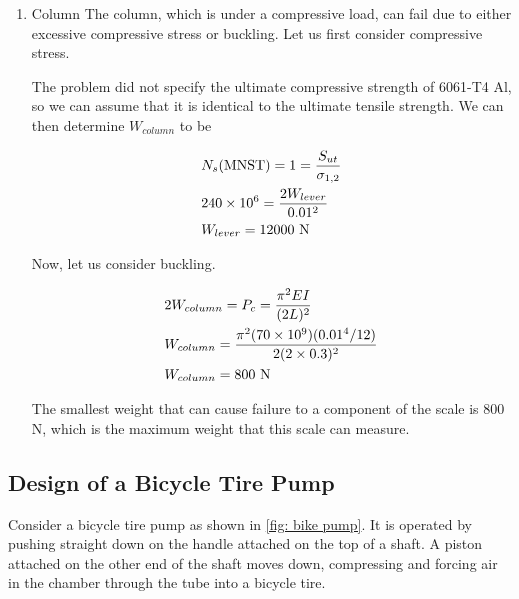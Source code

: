 \documentclass[a4paper,openany,nobib]{tufte-book}
\begin{document}
{{\begin{enumerate}
\begin{enumerate}
\item Column
\label{column}
The column, which is under a compressive load, can fail due to either
excessive compressive stress or buckling. Let us first consider
compressive stress.

The problem did not specify the ultimate compressive strength of 6061-T4
Al, so we can assume that it is identical to the ultimate tensile
strength. We can then determine \(W_{column}\) to be

$$\begin{gathered}
  N_s\text{(MNST)} = 1 = \frac{S_{ut}}{\sigma_{1,2}} \hfill \\
  240 \times 10^6 = \frac{2W_{lever}}{0.01^2} \hfill \\
  W_{lever} = 12000\text{ N} \hfill \\ 
\end{gathered}$$

Now, let us consider buckling.

$$\begin{gathered}
  2W_{column} = P_c = \frac{\pi ^2EI}{(2L)^2} \hfill \\
  W_{column} = \frac{\pi ^2(70 \times 10^9)(0.01^4/12)}{2(2 \times 0.3)^2} \hfill \\
  W_{column} = 800\text{ N} \hfill \\ 
\end{gathered}$$

The smallest weight that can cause failure to a component of the scale
is 800 N, which is the maximum weight that this scale can measure.
\end{enumerate}
\end{enumerate}

\subsection{Design of a Bicycle Tire Pump}
\label{design-of-a-bicycle-tire-pump}
    Consider a bicycle tire pump as shown in
\ref{fig: bike pump}. It is operated by pushing
straight down on the handle attached on the top of a shaft. A piston
attached on the other end of the shaft moves down, compressing and
forcing air in the chamber through the tube into a bicycle tire.

}}
\end{document}
